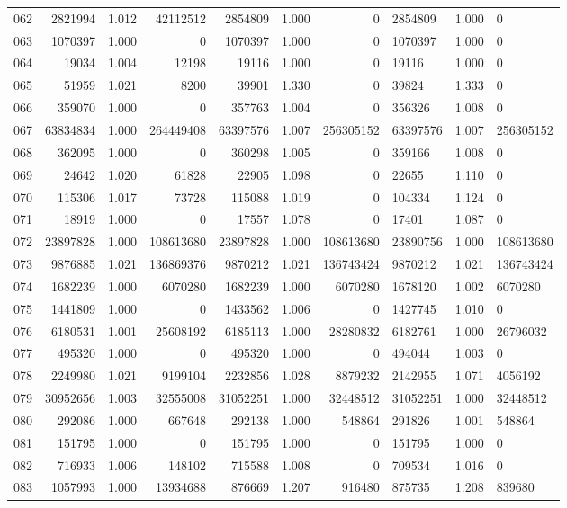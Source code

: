 \begin{longtable}{crrrrrr}
062 & 2821994 & 1.012 & 42112512 & 2854809 & 1.000 & 0 & 2854809 & 1.000 & 0 \\
063 & 1070397 & 1.000 & 0 & 1070397 & 1.000 & 0 & 1070397 & 1.000 & 0 \\
064 & 19034 & 1.004 & 12198 & 19116 & 1.000 & 0 & 19116 & 1.000 & 0 \\
065 & 51959 & 1.021 & 8200 & 39901 & 1.330 & 0 & 39824 & 1.333 & 0 \\
066 & 359070 & 1.000 & 0 & 357763 & 1.004 & 0 & 356326 & 1.008 & 0 \\
067 & 63834834 & 1.000 & 264449408 & 63397576 & 1.007 & 256305152 & 63397576 & 1.007 & 256305152 \\
068 & 362095 & 1.000 & 0 & 360298 & 1.005 & 0 & 359166 & 1.008 & 0 \\
069 & 24642 & 1.020 & 61828 & 22905 & 1.098 & 0 & 22655 & 1.110 & 0 \\
070 & 115306 & 1.017 & 73728 & 115088 & 1.019 & 0 & 104334 & 1.124 & 0 \\
071 & 18919 & 1.000 & 0 & 17557 & 1.078 & 0 & 17401 & 1.087 & 0 \\
072 & 23897828 & 1.000 & 108613680 & 23897828 & 1.000 & 108613680 & 23890756 & 1.000 & 108613680 \\
073 & 9876885 & 1.021 & 136869376 & 9870212 & 1.021 & 136743424 & 9870212 & 1.021 & 136743424 \\
074 & 1682239 & 1.000 & 6070280 & 1682239 & 1.000 & 6070280 & 1678120 & 1.002 & 6070280 \\
075 & 1441809 & 1.000 & 0 & 1433562 & 1.006 & 0 & 1427745 & 1.010 & 0 \\
076 & 6180531 & 1.001 & 25608192 & 6185113 & 1.000 & 28280832 & 6182761 & 1.000 & 26796032 \\
077 & 495320 & 1.000 & 0 & 495320 & 1.000 & 0 & 494044 & 1.003 & 0 \\
078 & 2249980 & 1.021 & 9199104 & 2232856 & 1.028 & 8879232 & 2142955 & 1.071 & 4056192 \\
079 & 30952656 & 1.003 & 32555008 & 31052251 & 1.000 & 32448512 & 31052251 & 1.000 & 32448512 \\
080 & 292086 & 1.000 & 667648 & 292138 & 1.000 & 548864 & 291826 & 1.001 & 548864 \\
081 & 151795 & 1.000 & 0 & 151795 & 1.000 & 0 & 151795 & 1.000 & 0 \\
082 & 716933 & 1.006 & 148102 & 715588 & 1.008 & 0 & 709534 & 1.016 & 0 \\
083 & 1057993 & 1.000 & 13934688 & 876669 & 1.207 & 916480 & 875735 & 1.208 & 839680 \\

\end{longtable}
